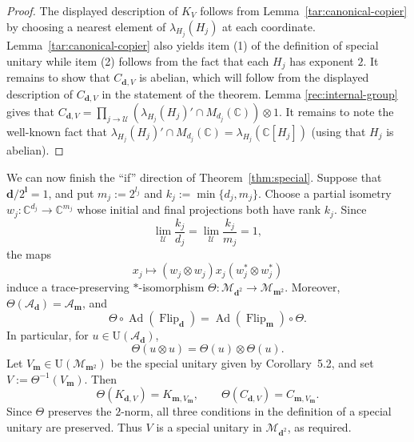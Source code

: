 \documentclass[12pt]{amsart}
\numberwithin{equation}{section}
\theoremstyle{definition}
\newcommand{\C}{\mathbb{C}}
\def\bb{\mathbb}
\def\cal{\mathcal}
\newcommand\cU{{\cal U}}
\begin{document}
\begin{proof}
The displayed description of $K_V$  follows from Lemma~\ref{tar:canonical-copier}
by choosing a nearest element of $\lambda_{H_j}(H_j)$ at each coordinate.  Lemma~\ref{tar:canonical-copier} also yields item (1) of the definition of special unitary while item (2) follows from the fact that each $H_j$ has exponent $2$.  It remains to show that $C_{\mathbf{d},V}$ is abelian, which will follow from the displayed description of $C_{\mathbf{d},V}$ in the statement of the theorem.  Lemma \ref{rec:internal-group} gives that $C_{\mathbf{d},V}=\prod_{j\to\cU}(\lambda_{H_j}(H_j)'\cap M_{d_j}(\C))\otimes 1$.  It remains to note the well-known fact that $\lambda_{H_j}(H_j)'\cap M_{d_j}(\C)=\lambda_{H_j}(\bb C[H_j])$ (using that $H_j$ is abelian).
\end{proof}

We can now finish the ``if'' direction of
Theorem~\ref{thm:special}.
Suppose that $\mathbf d/2^{\mathbf{l}}=1$,
and put $m_j:=2^{l_j}$ and
$k_j:=\min\{d_j,m_j\}$.
Choose a partial isometry
$w_j:\mathbb C^{d_j}\to\mathbb C^{m_j}$
whose initial and final projections both have rank $k_j$.
Since
\[
\lim_{\mathcal U}\frac{k_j}{d_j}
=\lim_{\mathcal U}\frac{k_j}{m_j}=1,
\]
the maps
\[
x_j\longmapsto
(w_j\otimes w_j)x_j(w_j^*\otimes w_j^*)
\]
induce a trace-preserving $*$-isomorphism $\Theta:\mathcal M_{\mathbf d^2}
\longrightarrow\mathcal M_{\mathbf m^2}$. 
Moreover, $\Theta(\mathcal A_{\mathbf d})
=\mathcal A_{\mathbf m}$, and
\[
\Theta\circ\operatorname{Ad}(\operatorname{Flip}_{\mathbf d})
=
\operatorname{Ad}(\operatorname{Flip}_{\mathbf m})
\circ\Theta.
\]
In particular, for $u\in\mathrm U(\mathcal A_{\mathbf d})$,
\[
\Theta(u\otimes u)=\Theta(u)\otimes\Theta(u).
\]
Let $V_{\mathbf m}\in\mathrm U(\mathcal M_{\mathbf m^2})$
be the special unitary given by Corollary~5.2,
and set $V:=\Theta^{-1}(V_{\mathbf m})$.
Then
\[
\Theta(K_{\mathbf d,V})=K_{\mathbf m,V_{\mathbf m}},
\qquad
\Theta(C_{\mathbf d,V})=C_{\mathbf m,V_{\mathbf m}}.
\]
Since $\Theta$ preserves the $2$-norm, all three
conditions in the definition of a special unitary
are preserved. Thus $V$ is a special unitary
in $\mathcal M_{\mathbf d^2}$, as required.
\end{document}
